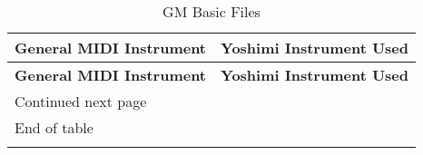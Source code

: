 %
%
%

\label{table:gm_basic_files}
\begin{longtable}{|l l|}

\caption{GM Basic Files} \\

\hline
   \textbf{General MIDI Instrument} &
      \textbf{Yoshimi Instrument Used} \\
\hline
\endfirsthead

\hline
   \textbf{General MIDI Instrument} &
      \textbf{Yoshimi Instrument Used} \\
\hline
\endhead

\hline
   Continued next page & \\
\hline
\endfoot

\hline
   End of table & \\
\hline
\endlastfoot


\end{longtable}
